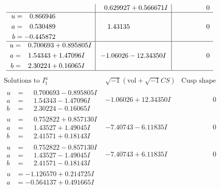 \documentclass[1p]{elsarticle_modified}
\theoremstyle{definition}
\newcommand{\I}{\sqrt{-1}}
\begin{document}
$$\begin{array}{c|c|c}
 & \phantom{-}0.629927 + 0.566671 I & \phantom{-0.000000 } 0 \\ \hline\begin{aligned}
u &= \phantom{-}0.866946\phantom{ +0.000000I} \\
a &= \phantom{-}0.530489\phantom{ +0.000000I} \\
b &= -0.445872\phantom{ +0.000000I}\end{aligned}
 & \phantom{-}1.43135\phantom{ +0.000000I} & \phantom{-0.000000 } 0 \\ \hline\begin{aligned}
u &= \phantom{-}0.700693 + 0.895805 I \\
a &= \phantom{-}1.54343 + 1.47096 I \\
b &= \phantom{-}2.30224 + 0.16065 I\end{aligned}
 & -1.06026 - 12.34350 I & \phantom{-0.000000 } 0\\
 \hline 
 \end{array}$$\newpage$$\begin{array}{c|c|c}  
\text{Solutions to }I^u_{1}& \I (\text{vol} + \sqrt{-1}CS) & \text{Cusp shape}\\
 \hline 
\begin{aligned}
u &= \phantom{-}0.700693 - 0.895805 I \\
a &= \phantom{-}1.54343 - 1.47096 I \\
b &= \phantom{-}2.30224 - 0.16065 I\end{aligned}
 & -1.06026 + 12.34350 I & \phantom{-0.000000 } 0 \\ \hline\begin{aligned}
u &= \phantom{-}0.752822 + 0.857130 I \\
a &= \phantom{-}1.43527 + 1.49045 I \\
b &= \phantom{-}2.41571 + 0.18143 I\end{aligned}
 & -7.40743 - 6.11835 I & \phantom{-0.000000 } 0 \\ \hline\begin{aligned}
u &= \phantom{-}0.752822 - 0.857130 I \\
a &= \phantom{-}1.43527 - 1.49045 I \\
b &= \phantom{-}2.41571 - 0.18143 I\end{aligned}
 & -7.40743 + 6.11835 I & \phantom{-0.000000 } 0 \\ \hline\begin{aligned}
u &= -1.126570 + 0.214725 I \\
a &= -0.564137 + 0.491665 I \\

\end{aligned}
\end{array}$$
\end{document}
